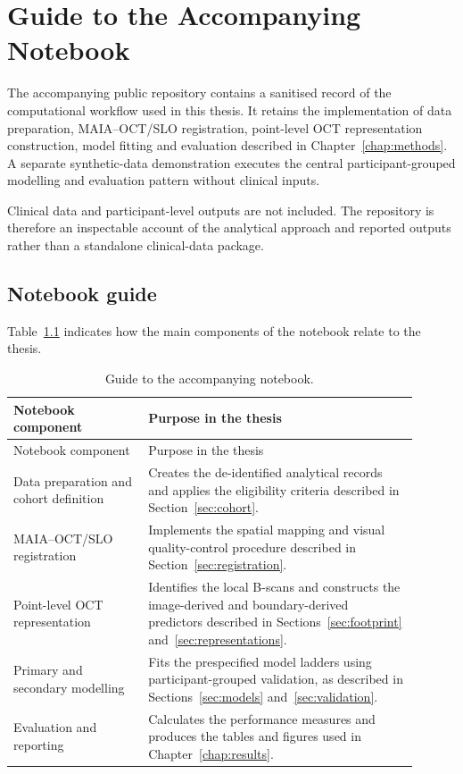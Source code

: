 \chapter{Guide to the Accompanying Notebook}
\label{app:reproducibility}

The accompanying public repository contains a sanitised record of the computational workflow used in this thesis. It retains the implementation of data preparation, MAIA--OCT/SLO registration, point-level OCT representation construction, model fitting and evaluation described in Chapter~\ref{chap:methods}. A separate synthetic-data demonstration executes the central participant-grouped modelling and evaluation pattern without clinical inputs.

Clinical data and participant-level outputs are not included. The repository is therefore an inspectable account of the analytical approach and reported outputs rather than a standalone clinical-data package.

\section{Notebook guide}

Table~\ref{tab:notebook-guide} indicates how the main components of the notebook relate to the thesis.

\begin{longtable}{p{0.30\linewidth}p{0.60\linewidth}}
\caption{Guide to the accompanying notebook.}\label{tab:notebook-guide}\\
\toprule
Notebook component & Purpose in the thesis \\
\midrule
\endfirsthead
\toprule
Notebook component & Purpose in the thesis \\
\midrule
\endhead
Data preparation and cohort definition & Creates the de-identified analytical records and applies the eligibility criteria described in Section~\ref{sec:cohort}. \\
MAIA--OCT/SLO registration & Implements the spatial mapping and visual quality-control procedure described in Section~\ref{sec:registration}. \\
Point-level OCT representation & Identifies the local B-scans and constructs the image-derived and boundary-derived predictors described in Sections~\ref{sec:footprint} and~\ref{sec:representations}. \\
Primary and secondary modelling & Fits the prespecified model ladders using participant-grouped validation, as described in Sections~\ref{sec:models} and~\ref{sec:validation}. \\
Evaluation and reporting & Calculates the performance measures and produces the tables and figures used in Chapter~\ref{chap:results}. \\
\bottomrule
\end{longtable}

